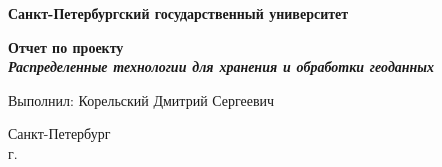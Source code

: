 \begin{titlepage}
\begin{center}

\textbf{Санкт-Петербургский государственный университет}

\vspace{45mm}

\textbf{\large Отчет по проекту} \\[4mm]
\textbf{\textit{\large Распределенные технологии для хранения и обработки геоданных}}

\vspace{30mm}

Выполнил: Корельский Дмитрий Сергеевич

\vfill

Санкт-Петербург\\
\the\year{} г.

\end{center}
\end{titlepage}
\restoregeometry
\addtocounter{page}{1}
